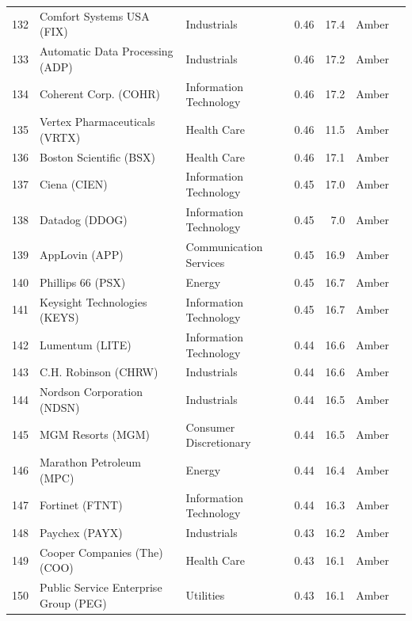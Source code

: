 \documentclass[11pt,a4paper]{article}
\begin{document}
{\begin{longtable}{r p{4.4cm} p{2.8cm} r r l l}
132 & Comfort Systems USA (FIX) & Industrials & 0.46 & 17.4 & \cellcolor[HTML]{FFEB9C}Amber &  \\
133 & Automatic Data Processing (ADP) & Industrials & 0.46 & 17.2 & \cellcolor[HTML]{FFEB9C}Amber &  \\
134 & Coherent Corp. (COHR) & Information Technology & 0.46 & 17.2 & \cellcolor[HTML]{FFEB9C}Amber &  \\
135 & Vertex Pharmaceuticals (VRTX) & Health Care & 0.46 & 11.5 & \cellcolor[HTML]{FFEB9C}Amber &  \\
136 & Boston Scientific (BSX) & Health Care & 0.46 & 17.1 & \cellcolor[HTML]{FFEB9C}Amber &  \\
137 & Ciena (CIEN) & Information Technology & 0.45 & 17.0 & \cellcolor[HTML]{FFEB9C}Amber &  \\
138 & Datadog (DDOG) & Information Technology & 0.45 & 7.0 & \cellcolor[HTML]{FFEB9C}Amber &  \\
139 & AppLovin (APP) & Communication Services & 0.45 & 16.9 & \cellcolor[HTML]{FFEB9C}Amber &  \\
140 & Phillips 66 (PSX) & Energy & 0.45 & 16.7 & \cellcolor[HTML]{FFEB9C}Amber &  \\
141 & Keysight Technologies (KEYS) & Information Technology & 0.45 & 16.7 & \cellcolor[HTML]{FFEB9C}Amber &  \\
142 & Lumentum (LITE) & Information Technology & 0.44 & 16.6 & \cellcolor[HTML]{FFEB9C}Amber &  \\
143 & C.H. Robinson (CHRW) & Industrials & 0.44 & 16.6 & \cellcolor[HTML]{FFEB9C}Amber &  \\
144 & Nordson Corporation (NDSN) & Industrials & 0.44 & 16.5 & \cellcolor[HTML]{FFEB9C}Amber &  \\
145 & MGM Resorts (MGM) & Consumer Discretionary & 0.44 & 16.5 & \cellcolor[HTML]{FFEB9C}Amber &  \\
146 & Marathon Petroleum (MPC) & Energy & 0.44 & 16.4 & \cellcolor[HTML]{FFEB9C}Amber &  \\
147 & Fortinet (FTNT) & Information Technology & 0.44 & 16.3 & \cellcolor[HTML]{FFEB9C}Amber &  \\
148 & Paychex (PAYX) & Industrials & 0.43 & 16.2 & \cellcolor[HTML]{FFEB9C}Amber &  \\
149 & Cooper Companies (The) (COO) & Health Care & 0.43 & 16.1 & \cellcolor[HTML]{FFEB9C}Amber &  \\
150 & Public Service Enterprise Group (PEG) & Utilities & 0.43 & 16.1 & \cellcolor[HTML]{FFEB9C}Amber &  \\

\end{longtable}}
\end{document}

